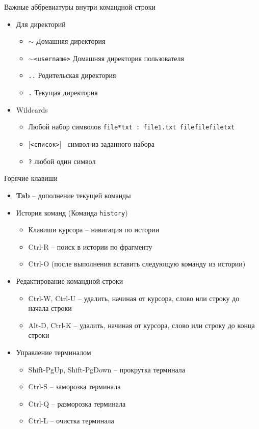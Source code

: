 \begin{frame}{Важные аббревиатуры внутри командной строки}
  \begin{itemize}
    \item Для директорий
      \begin{itemize}
        \item {\tt $\sim$} Домашняя директория
        \item {\tt $\sim$<username>} Домашняя директория пользователя
        \item {\tt ..} Родительская директория
        \item {\tt .} Текущая директория
      \end{itemize}
      \pause  
    \item Wildcards
      \begin{itemize}
        \item {\tt *} Любой набор символов {\tt file*txt : file1.txt filefilefiletxt}
        \item {\tt $[$<список>$]$ } символ из заданного набора
        \item {\tt ?} любой один символ
      \end{itemize}

  \end{itemize}
\end{frame}       

\begin{frame}{Горячие клавиши}
  \begin{itemize}
    \item \textbf{Tab} -- дополнение текущей команды
      \pause
    \item История команд (Команда {\tt history})
      \begin{itemize}
        \item Клавиши курсора -- навигация по истории
        \item Ctrl-R -- поиск в истории по фрагменту
        \item Ctrl-O (после выполнения вставить следующую команду из истории)
      \end{itemize}
    \item Редактирование командной строки
      \begin{itemize}
        \item Ctrl-W, Ctrl-U -- удалить, начиная от курсора, слово или строку до начала строки
        \item Alt-D, Ctrl-K -- удалить, начиная от курсора, слово или строку до конца строки
      \end{itemize}
    \item Управление терминалом
      \begin{itemize}
        \item Shift-PgUp, Shift-PgDown -- прокрутка терминала
        \item Ctrl-S -- заморозка терминала
        \item Ctrl-Q -- разморозка терминала
        \item Ctrl-L -- очистка терминала
      \end{itemize}
  \end{itemize}
\end{frame}


